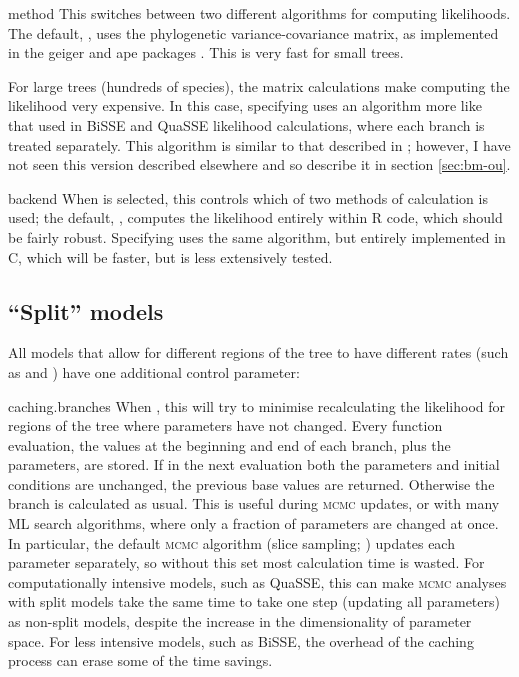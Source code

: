 \documentclass[12pt,twoside]{article}
\newenvironment{cdescription}{\begin{description}[font=\tt,leftmargin=4em,labelindent=2em,noitemsep]\addtolength{\parskip}{.75ex}}{\end{description}}
\begin{document}
\begin{cdescription}
\item[method] This switches between two different algorithms for
  computing likelihoods.  The default, , uses the
  phylogenetic variance-covariance matrix, as implemented in the
  geiger and ape packages \citep{ape,geiger}.  This is very fast for
  small trees.
  
  For large trees (hundreds of species), the matrix calculations make
  computing the likelihood very expensive.  In this case, specifying
   uses an algorithm more like that used in
  BiSSE and QuaSSE likelihood calculations, where each branch is
  treated separately.
  This algorithm is similar to that described in
  \citet{Felsenstein-1973-471}; however, I have not seen this version
  described elsewhere and so describe it in section \ref{sec:bm-ou}.

\item[backend] When  is selected, this controls
  which of two methods of calculation is used; the default,
  , computes the likelihood entirely within R code,
  which should be fairly robust.  Specifying  uses
  the same algorithm, but entirely implemented in C, which will be
  faster, but is less extensively tested.
\end{cdescription}

\subsection{``Split'' models}
\enlargethispage{\baselineskip}
All models that allow for different regions of the tree to have
different rates (such as  and
) have one additional control parameter:
\begin{cdescription}
\item [caching.branches] When , this will try to minimise
  recalculating the likelihood for regions of the tree where
  parameters have not changed.
  Every function evaluation, the values at the beginning and end of
  each branch, plus the parameters, are stored.  If in the next
  evaluation both the parameters and initial conditions are unchanged,
  the previous base values are returned.  Otherwise the branch is
  calculated as usual.
  This is useful during \textsc{mcmc} updates, or with many ML search
  algorithms, where only a fraction of parameters are changed at once.
  In particular, the default \textsc{mcmc} algorithm (slice sampling;
  \citealp{Neal-2003-705}) updates each parameter separately, so
  without this set most calculation time is wasted.
  For computationally intensive models, such as QuaSSE, this can make
  \textsc{mcmc} analyses with split models take the same time to take
  one step (updating all parameters) as non-split models, despite the
  increase in the dimensionality of parameter space.  For less
  intensive models, such as BiSSE, the overhead of the caching process
  can erase some of the time savings.
\end{cdescription}
\end{document}
